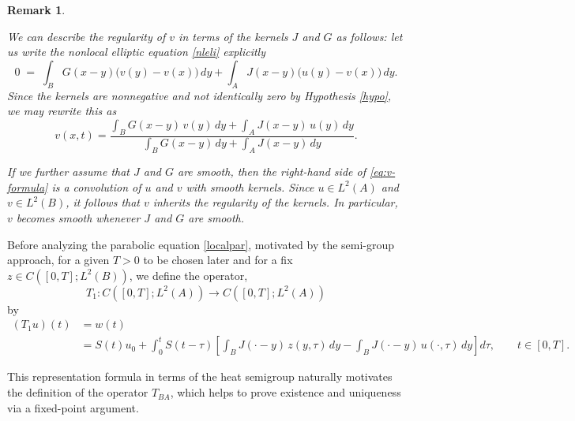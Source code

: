 \documentclass[reqno]{amsart}
\numberwithin{equation}{section}
\newtheorem{remark}[theorem]{Remark}
\begin{document}
\begin{remark}\label{vregularity} {\rm
We can describe the regularity of $v$ in terms of the kernels $J$ and $G$ as follows: let us write the nonlocal elliptic equation \eqref{nleli} explicitly
\[
0 \;=\; \int_{B} G(x-y)\bigl(v(y)-v(x)\bigr)\,dy
      +\int_{A} J(x-y)\bigl(u(y)-v(x)\bigr)\,dy.
\]
Since the kernels are nonnegative and not identically zero by Hypothesis \eqref{hypo}, we may rewrite this as
\begin{equation}\label{eq:v-formula}
v(x,t)
    =\frac{\displaystyle\int_{B} G(x-y)\,v(y)\,dy
           +\displaystyle\int_{A} J(x-y)\,u(y)\,dy}
           {\displaystyle\int_{B} G(x-y)\,dy
           +\displaystyle\int_{A} J(x-y)\,dy}.
\end{equation}

If we further assume that $J$ and $G$ are smooth, then the right-hand side of 
\eqref{eq:v-formula} is a convolution of $u$ and $v$ with smooth kernels.
Since $u\in L^{2}(A)$ and $v\in L^{2}(B)$, it follows that $v$ 
inherits the regularity of the kernels. In particular, $v$ becomes smooth whenever $J$ and $G$ are smooth. }
\end{remark}




Before analyzing the parabolic equation \eqref{localpar}, motivated by the semi-group approach, for a given $T>0$ to be chosen later and for a fix $z\in C([0,T];L^2(B))$, we define the operator,
\[
T_{1}: C([0,T];L^{2}(A)) \longrightarrow C([0,T];L^{2}(A))
\]
by
\begin{align}\label{def-T1}
(T_{1}u)(t)
    &= w(t) \\
    &= S(t)u_{0}
       + \int_{0}^{t} S(t-\tau)
          \left[
             \int_{B} J(\cdot-y)\, z(y,\tau)\,dy
             - \int_{B} J(\cdot-y)\, u(\cdot,\tau)\,dy
          \right] d\tau,
       \qquad t\in[0,T]. \nonumber
\end{align}

This representation formula in terms of the heat semigroup naturally motivates the definition of the operator $T_{BA}$, which helps to prove existence and uniqueness via a fixed-point argument.
\end{document}
